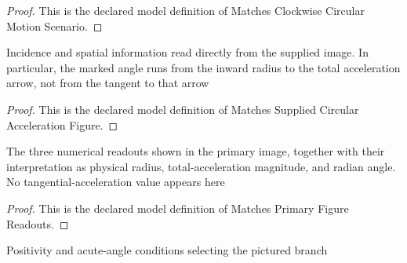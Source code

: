 \begin{proof}
  This is the declared model definition of Matches Clockwise Circular Motion Scenario.
\end{proof}
\begin{definition}
  \label{def:physics:phyx-mini-0688:phyxminiproblems-problemphyxmini0688-matchessuppliedcircularaccelerationfigure}
  Incidence and spatial information read directly from the supplied image. In particular, the marked angle runs from the inward radius to the total acceleration arrow, not from the tangent to that arrow
\end{definition}
\begin{proof}
  This is the declared model definition of Matches Supplied Circular Acceleration Figure.
\end{proof}
\begin{definition}
  \label{def:physics:phyx-mini-0688:phyxminiproblems-problemphyxmini0688-matchesprimaryfigurereadouts}
  The three numerical readouts shown in the primary image, together with their interpretation as physical radius, total-acceleration magnitude, and radian angle. No tangential-acceleration value appears here
\end{definition}
\begin{proof}
  This is the declared model definition of Matches Primary Figure Readouts.
\end{proof}
\begin{definition}
  \label{def:physics:phyx-mini-0688:phyxminiproblems-problemphyxmini0688-hasphysicalcircularmotionparameters}
  Positivity and acute-angle conditions selecting the pictured branch
\end{definition}
